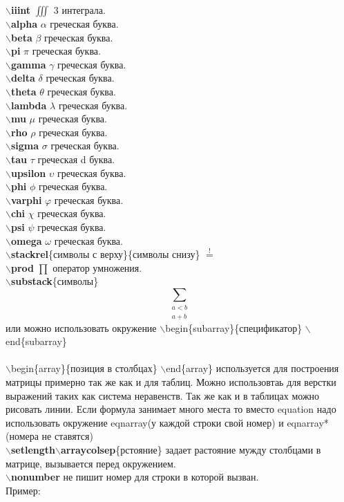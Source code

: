 \documentclass{article}
\newcommand{\bb}[1]{{\bfseries $\backslash$#1}} %
\begin{document}
\bb{iiint} $\iiint$ 3 интеграла.\\
\bb{alpha} $\alpha$ греческая буква.\\
\bb{beta} $\beta$ греческая буква.\\
\bb{pi} $\pi$ греческая буква.\\
\bb{gamma} $\gamma$ греческая буква.\\
\bb{delta} $\delta$ греческая буква.\\
\bb{theta} $\theta$ греческая буква.\\
\bb{lambda} $\lambda$ греческая буква.\\
\bb{mu} $\mu$ греческая буква.\\
\bb{rho} $\rho$ греческая буква.\\
\bb{sigma} $\sigma$ греческая буква.\\
\bb{tau} $\tau$ греческая d
буква.\\
\bb{upsilon} $\upsilon$ греческая буква.\\
\bb{phi} $\phi$ греческая буква.\\
\bb{varphi} $\varphi$ греческая буква.\\
\bb{chi} $\chi$ греческая буква.\\
\bb{psi} $\psi$ греческая буква.\\
\bb{omega} $\omega$ греческая буква.\\
\bb{stackrel}\{символы с верху\}\{символы снизу\} $\stackrel{!}{=}$\\
\bb{prod} $\prod$ оператор умножения.\\
\bb{substack}\{символы\} \[\sum_{\substack{a<b \\ a+b}}\] или можно использовать окружение $\backslash$begin\{subarray\}\{спецификатор\} $\backslash$end\{subarray\}\\ \\
 $\backslash$begin\{array\}\{позиция в столбцах\} $\backslash$end\{array\} используется для построения матрицы примерно так же как и для таблиц. Можно использовтаь для верстки выражений таких как система неравенств. Так же как и в таблицах можно рисовать линии. Если формула занимает много места то вместо equation надо использовать окружение eqnarray(у каждой строки свой номер) и eqnarray*(номера не ставятся)\\
 \bb{setlength$\backslash$arraycolsep}\{рстояние\} задает растояние мужду столбцами в матрице, вызывается перед окружением.\\
 \bb{nonumber} не пишит номер для строки в которой вызван. \\
Пример:
\end{document}
